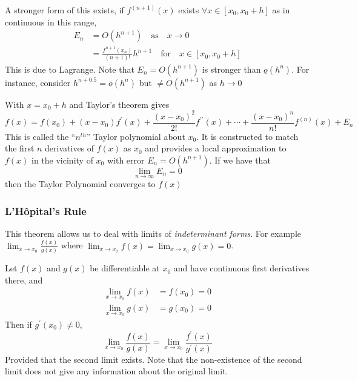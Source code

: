 \documentclass{article}
\begin{document}
A stronger form of this exists, if $f^{(n+1)}(x)$ exists $\forall x \in [x_0, x_0 + h]$ as in continuous in this range,
\begin{align*}
    E_n &= O(h^{n+1}) \quad \text{as} \quad x \rightarrow 0 \\
    &= \frac{f^{n+1}(x_n)}{(n+1)!}h^{n+1} \quad \text{for} \quad x \in [x_0, x_0 +h]
\end{align*}
This is due to Lagrange. Note that $E_n = O(h^{n+1})$ is stronger than $\underline{o}(h^n)$. For instance, consider $h^{n + 0.5} = \underline{o}(h^n)$ but $\neq O(h^{n+1})$ as $h \rightarrow 0$

\begin{defi}
    With $x = x_0 + h$ and Taylor's theorem gives
    \[
        f(x) = f(x_0) + (x - x_0)f^{\prime}(x) + \frac{(x - x_0)^2}{2!}f^{\prime\prime}(x) + \cdots + \frac{(x - x_0)^n}{n!}f^{(n)}(x) + E_n
    \]
    This is called the ``$n^{th}$'' Taylor polynomial about $x_0$. It is constructed to match the first $n$ derivatives of $f(x)$ as $x_0$ and provides a local approximation to $f(x)$ in the vicinity of $x_0$ with error $E_n = O(h^{n+1})$. If we have that
    \[
        \lim_{n \rightarrow \infty}{E_n} = 0  
    \]
    then the Taylor Polynomial converges to $f(x)$
\end{defi}

\subsubsection{L'H\^opital's Rule}
This theorem allows us to deal with limits of \emph{indeterminant forms}. For example $\lim_{x \rightarrow x_0}{\frac{f(x)}{g(x)}}$ where $\lim_{x \rightarrow x_0}{f(x)} = \lim_{x \rightarrow x_0}{g(x)} = 0$.

\begin{thm}
    Let $f(x)$ and $g(x)$ be differentiable at $x_0$ and have continuous first derivatives there, and
    \begin{align*}
        \lim_{x \rightarrow x_0}{f(x)} &= f(x_0) = 0 \\
        \lim_{x \rightarrow x_0}{g(x)} &= g(x_0) = 0
    \end{align*}
    Then if $g^{\prime}(x_0) \neq 0$,
    \[
        \lim_{x \rightarrow x_0}{\frac{f(x)}{g(x)}} = \lim_{x \rightarrow x_0}{\frac{f^{\prime}(x)}{g^{\prime}(x)}}
    \]
    Provided that the second limit exists. Note that the non-existence of the second limit does not give any information about the original limit.
\end{thm}
\end{document}
